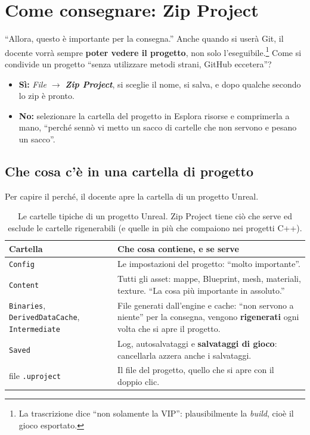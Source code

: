 \section{Come consegnare: Zip Project}
\label{gd12:sec:zip}

``Allora, questo è importante per la consegna.'' Anche quando si userà Git, il
docente vorrà sempre \textbf{poter vedere il progetto}, non solo
l'eseguibile.\footnote{La trascrizione dice ``non solamente la VIP'':
plausibilmente la \emph{build}, cioè il gioco esportato.} Come si condivide un
progetto ``senza utilizzare metodi strani, GitHub eccetera''?
\begin{itemize}
  \item \textbf{Sì:} \emph{File $\rightarrow$ \textbf{Zip Project}}, si
        sceglie il nome, si salva, e dopo qualche secondo lo zip è pronto.
  \item \textbf{No:} selezionare la cartella del progetto in Esplora risorse e
        comprimerla a mano, ``perché sennò vi metto un sacco di cartelle che
        non servono e pesano un sacco''.
\end{itemize}

\subsection{Che cosa c'è in una cartella di progetto}

Per capire il perché, il docente apre la cartella di un progetto Unreal.

\begin{table}[htbp]
\centering
\begin{tabular}{p{3.2cm}p{9.8cm}}
\toprule
\textbf{Cartella} & \textbf{Che cosa contiene, e se serve} \\
\midrule
\texttt{Config} & Le impostazioni del progetto: ``molto importante''. \\
\texttt{Content} & Tutti gli asset: mappe, Blueprint, mesh, materiali,
  texture. ``La cosa più importante in assoluto.'' \\
\texttt{Binaries}, \texttt{DerivedDataCache}, \texttt{Intermediate} & File
  generati dall'engine e cache: ``non servono a niente'' per la consegna,
  vengono \textbf{rigenerati} ogni volta che si apre il progetto. \\
\texttt{Saved} & Log, autosalvataggi e \textbf{salvataggi di gioco}: cancellarla
  azzera anche i salvataggi. \\
file \texttt{.uproject} & Il file del progetto, quello che si apre con
  il doppio clic. \\
\bottomrule
\end{tabular}
\caption{Le cartelle tipiche di un progetto Unreal. Zip Project tiene ciò che
serve ed esclude le cartelle rigenerabili (e quelle in più che compaiono nei
progetti C++).}
\label{gd12:tab:cartelle}
\end{table}

